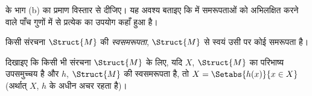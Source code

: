 \documentclass[../../../include/open-logic-section]{subfiles}
\begin{document}
\begin{prob}
 के भाग (b) का प्रमाण विस्तार से दीजिए। यह
अवश्य बताइए कि  में समरूपताओं को
अभिलक्षित करने वाले पाँच गुणों में से प्रत्येक का उपयोग कहाँ हुआ है।
\end{prob}

\begin{defn}
किसी संरचना $\Struct{M}$ की \emph{स्वसमरूपता}, $\Struct{M}$ से स्वयं उसी
पर कोई समरूपता है।
\end{defn}

\begin{prob}
दिखाइए कि किसी भी संरचना $\Struct{M}$ के लिए, यदि $X$, $\Struct{M}$ का
परिभाष्य उपसमुच्चय है और $h$, $\Struct{M}$ की स्वसमरूपता है, तो $X
= \Setabs{h(x)}{x \in X}$ (अर्थात् $X$, $h$ के अधीन अचर रहता है)।
\end{prob}
\end{document}
